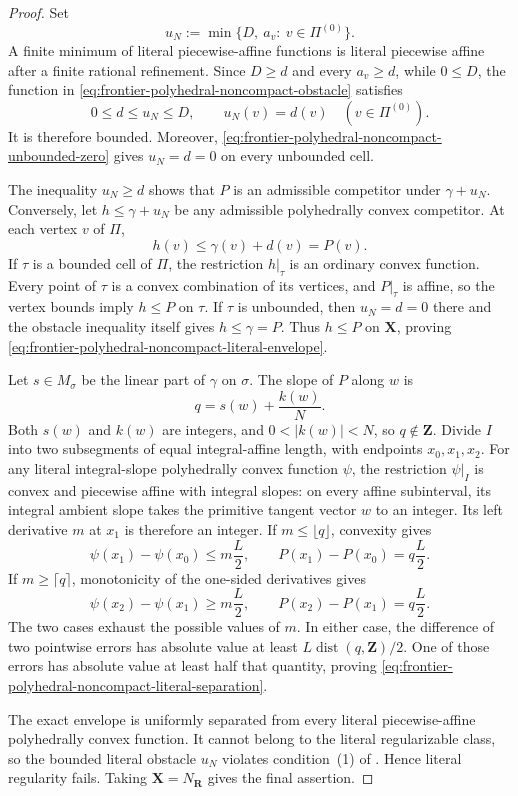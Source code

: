 \begin{proof}
Set
\begin{equation}
        u_N:=\min\bigl\{D,\ a_v:\ v\in\Pi^{(0)}\bigr\}.
 \label{eq:frontier-polyhedral-noncompact-obstacle}
\end{equation}
A finite minimum of literal piecewise-affine functions is literal
piecewise affine after a finite rational refinement.  Since $D\geq d$ and
every $a_v\geq d$, while $0\leq D$, the function in
\eqref{eq:frontier-polyhedral-noncompact-obstacle} satisfies
\begin{equation}
        0\leq d\leq u_N\leq D,
        \qquad u_N(v)=d(v)\quad(v\in\Pi^{(0)}).
 \label{eq:frontier-polyhedral-noncompact-vertex-contact}
\end{equation}
It is therefore bounded.  Moreover,
\eqref{eq:frontier-polyhedral-noncompact-unbounded-zero} gives
$u_N=d=0$ on every unbounded cell.

The inequality $u_N\geq d$ shows that $P$ is an admissible competitor under
$\gamma+u_N$.  Conversely, let $h\leq\gamma+u_N$ be any admissible
polyhedrally convex competitor.  At each vertex $v$ of $\Pi$,
\[
                      h(v)\leq\gamma(v)+d(v)=P(v).
\]
If $\tau$ is a bounded cell of $\Pi$, the restriction $h|_\tau$ is an
ordinary convex function.  Every point of $\tau$ is a convex combination of
its vertices, and $P|_\tau$ is affine, so the vertex bounds imply
$h\leq P$ on $\tau$.  If $\tau$ is unbounded, then
$u_N=d=0$ there and the obstacle inequality itself gives
$h\leq\gamma=P$.  Thus $h\leq P$ on $\mathbf X$, proving
\eqref{eq:frontier-polyhedral-noncompact-literal-envelope}.

Let $s\in M_\sigma$ be the linear part of $\gamma$ on $\sigma$.  The slope
of $P$ along $w$ is
\[
                         q=s(w)+\frac{k(w)}{N}.
\]
Both $s(w)$ and $k(w)$ are integers, and
$0<|k(w)|<N$, so $q\notin\mathbf Z$.  Divide $I$ into two subsegments of
equal integral-affine length, with endpoints $x_0,x_1,x_2$.  For any literal
integral-slope polyhedrally convex function $\psi$, the restriction
$\psi|_I$ is convex and piecewise affine with integral slopes: on every
affine subinterval, its integral ambient slope takes the primitive tangent
vector $w$ to an integer.  Its left
derivative $m$ at $x_1$ is therefore an integer.  If
$m\leq\lfloor q\rfloor$, convexity gives
\[
 \psi(x_1)-\psi(x_0)\leq m\frac L2,
 \qquad P(x_1)-P(x_0)=q\frac L2.
\]
If $m\geq\lceil q\rceil$, monotonicity of the one-sided derivatives gives
\[
 \psi(x_2)-\psi(x_1)\geq m\frac L2,
 \qquad P(x_2)-P(x_1)=q\frac L2.
\]
The two cases exhaust the possible values of $m$.  In either case, the
difference of two pointwise errors has absolute value at least
$L\operatorname{dist}(q,\mathbf Z)/2$.  One of those errors has absolute
value at least half that quantity, proving
\eqref{eq:frontier-polyhedral-noncompact-literal-separation}.

The exact envelope is uniformly separated from every literal
piecewise-affine polyhedrally convex function.  It cannot belong to the
literal regularizable class, so the bounded literal obstacle $u_N$ violates
condition~(1) of \cite[Theorem~6.4]{BMPS26}.  Hence literal regularity fails.
Taking $\mathbf X=N_{\mathbf R}$ gives the final assertion.
\end{proof}

